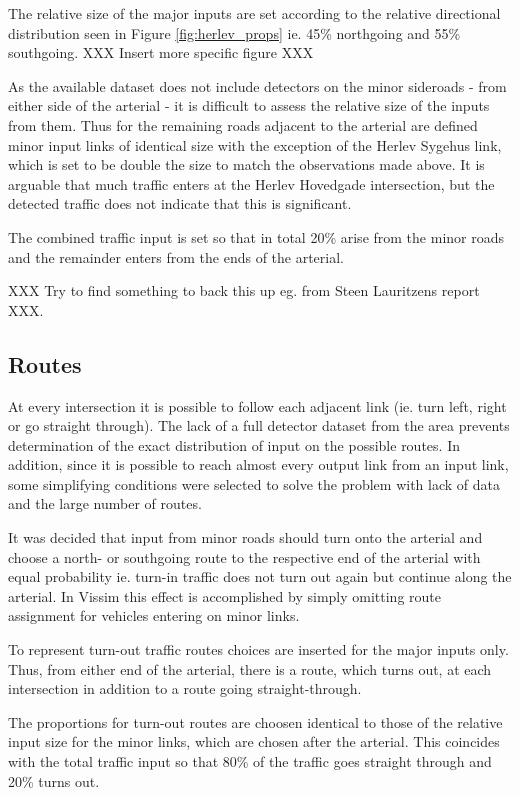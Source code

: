 The relative size of the major inputs are set according to the relative directional distribution seen in Figure \ref{fig:herlev_props} ie. 45\% northgoing and 55\% southgoing. XXX Insert more specific figure XXX

As the available dataset does not include detectors on the minor sideroads - from either side of the arterial - it is difficult to assess the relative size of the inputs from them. Thus for the remaining roads adjacent to the arterial are defined minor input links of identical size with the exception of the Herlev Sygehus link, which is set to be double the size to match the observations made above.
It is arguable that much traffic enters at the Herlev Hovedgade intersection, but the detected traffic does not indicate that this is significant.

The combined traffic input is set so that in total 20\% arise from the minor roads and the remainder enters from the ends of the arterial. 

XXX Try to find something to back this up eg. from Steen Lauritzens report XXX.

\subsection{Routes}
At every intersection it is possible to follow each adjacent link (ie. turn left, right or go straight through). The lack of a full detector dataset from the area prevents determination of the exact distribution of input on the possible routes. In addition, since it is possible to reach almost every output link from an input link, some simplifying conditions were selected to solve the problem with lack of data and the large number of routes.

It was decided that input from minor roads should turn onto the arterial and choose a north- or southgoing route to the respective end of the arterial with equal probability ie. turn-in traffic does not turn out again but continue along the arterial. In Vissim this effect is accomplished by simply omitting route assignment for vehicles entering on minor links.

To represent turn-out traffic routes choices are inserted for the major inputs only. Thus, from either end of the arterial, there is a route, which turns out, at each intersection in addition to a route going straight-through. 

The proportions for turn-out routes are choosen identical to those of the relative input size for the minor links, which are chosen after the arterial. This coincides with the total traffic input so that 80\% of the traffic goes straight through and 20\% turns out.

